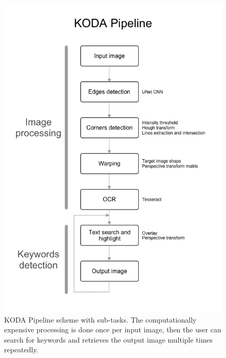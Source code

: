 \documentclass[a4paper]{article}
\begin{document}
\begin{figure}[H]
	\includegraphics[width=\linewidth]{Pipeline.png}
	\caption{KODA Pipeline scheme with sub-tasks. The computationally expensive processing is done once per input image, then the user can search for keywords and retrieves the output image multiple times repeatedly.}
	\label{fig:pipeline}
\end{figure}
\end{document}
